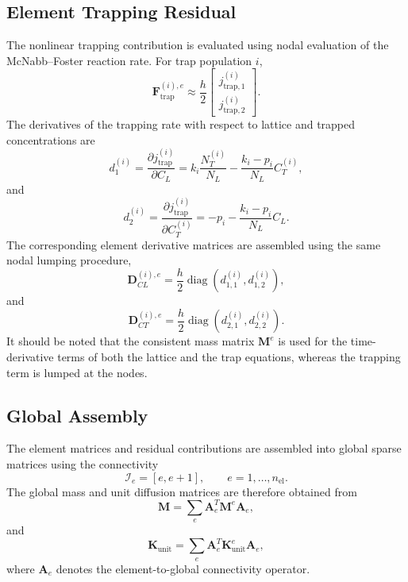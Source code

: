 \documentclass[a4paper,12pt,oneside]{report}
\begin{document}
\subsection{Element Trapping Residual}

The nonlinear trapping contribution is evaluated using nodal evaluation of the McNabb--Foster reaction rate. For trap population $i$,
\begin{equation}
\mathbf{F}_{\mathrm{trap}}^{(i),e}
\approx
\frac{h}{2}
\begin{bmatrix}
j_{\mathrm{trap},1}^{(i)}\\
j_{\mathrm{trap},2}^{(i)}
\end{bmatrix}.
\label{eq:ch3_trap_vector}
\end{equation}
The derivatives of the trapping rate with respect to lattice and trapped concentrations are
\begin{equation}
d_1^{(i)}
=
\frac{\partial j_{\mathrm{trap}}^{(i)}}
{\partial C_L}
=
k_i\frac{N_T^{(i)}}{N_L}
-
\frac{k_i-p_i}{N_L}C_T^{(i)},
\label{eq:ch3_d1}
\end{equation}
and
\begin{equation}
d_2^{(i)}
=
\frac{\partial j_{\mathrm{trap}}^{(i)}}
{\partial C_T^{(i)}}
=
-p_i
-
\frac{k_i-p_i}{N_L}C_L.
\label{eq:ch3_d2}
\end{equation}
The corresponding element derivative matrices are assembled using the same nodal lumping procedure,
\begin{equation}
\mathbf{D}_{CL}^{(i),e}
=
\frac{h}{2}
\operatorname{diag}
\left(
d_{1,1}^{(i)},d_{1,2}^{(i)}
\right),
\end{equation}
and
\begin{equation}
\mathbf{D}_{CT}^{(i),e}
=
\frac{h}{2}
\operatorname{diag}
\left(
d_{2,1}^{(i)},d_{2,2}^{(i)}
\right).
\end{equation}
It should be noted that the consistent mass matrix $\mathbf{M}^e$ is used for the time-derivative terms of both the lattice and the trap equations, whereas the trapping term is lumped at the nodes.

\subsection{Global Assembly}

The element matrices and residual contributions are assembled into global sparse matrices using the connectivity
\begin{equation}
\mathcal{I}_e=[e,e+1],
\qquad
e=1,\ldots,n_{\mathrm{el}}.
\end{equation}
The global mass and unit diffusion matrices are therefore obtained from
\begin{equation}
\mathbf{M}
=
\sum_e
\mathbf{A}_e^T
\mathbf{M}^e
\mathbf{A}_e,
\end{equation}
and
\begin{equation}
\mathbf{K}_{\mathrm{unit}}
=
\sum_e
\mathbf{A}_e^T
\mathbf{K}_{\mathrm{unit}}^e
\mathbf{A}_e,
\end{equation}
where $\mathbf{A}_e$ denotes the element-to-global connectivity operator.
\end{document}
